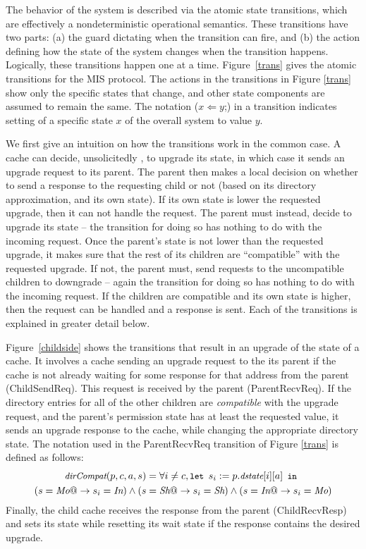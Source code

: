 The behavior of the system is described via the atomic state transitions, which
are effectively a nondeterministic operational semantics. These transitions
have two parts: (a) the guard dictating when the transition can fire, and (b)
the action defining how the state of the system changes when the transition
happens. Logically, these transitions happen one at a time.  Figure~\ref{trans}
gives the atomic transitions for the MIS protocol.  The actions in the
transitions in Figure \ref{trans} show only the specific states that change,
and other state components are assumed to remain the same.  The notation ($x
\Leftarrow y$;) in a transition indicates setting of a specific state $x$ of
the overall system to value $y$.

We first give an intuition on how the transitions work in the common case.
A cache can decide, unsolicitedly , to upgrade its state,
in which case it sends an upgrade request to its parent. The parent then makes
a local decision on whether to send a response to the requesting child or not
(based on its directory approximation, and its own state). If its own state is
lower the requested upgrade, then it can not handle the request. The parent
must instead, decide to upgrade its state -- the transition for doing so has
nothing to do with the incoming request.  Once the parent's state is not lower
than the requested upgrade, it makes sure that the rest of its children are
``compatible'' with the requested upgrade. If not, the parent must, send
requests to the uncompatible children to downgrade -- again the transition for
doing so has nothing to do with the incoming request. If the children are
compatible and its own state is higher, then the request can be handled and a
response is sent. Each of the transitions is explained in greater detail below.

Figure~\ref{childside} shows the transitions that result in an upgrade of the
state of a cache. It involves a cache sending an upgrade request to the its
parent if the cache is not already waiting for some response for that address
from the parent (ChildSendReq). This request is received by the parent
(ParentRecvReq). If the directory entries for all of the other children are
\emph{compatible} with the upgrade request, and the parent's permission state has
at least the requested value, it sends an upgrade response to the cache, while
changing the appropriate directory state. The notation \compat{} used in
the ParentRecvReq transition of Figure \ref{trans} is defined as follows:
\begin{multline*}
\small
\compat(p, c, a, s) = \forall i \ne c,
\mylet s_i := p.\dstate[i][a] \myin\\
 (s = \Mo @-> s_i = \In) \wedge (s = \Sh @-> s_i = \Sh) \wedge (s = \In @-> s_i = \Mo)
\end{multline*}
Finally, the child cache receives the response from the parent (ChildRecvResp)
and sets its state while resetting its wait state if the response contains the
desired upgrade.

